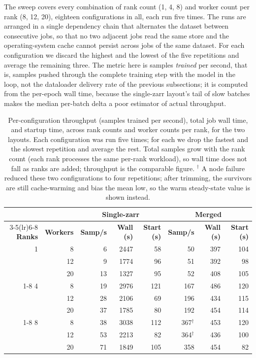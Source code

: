 \documentclass[12pt,a4paper]{article}
\begin{document}
The sweep covers every combination of rank count (1, 4, 8) and worker count per rank
(8, 12, 20), eighteen configurations in all, each run five times. The runs are arranged in a
single dependency chain that alternates the dataset between consecutive jobs, so that no two
adjacent jobs read the same store and the operating-system cache cannot persist across jobs
of the same dataset. For each configuration we discard the highest and the lowest of the
five repetitions and average the remaining three. The metric here is samples \emph{trained}
per second, that is, samples pushed through the complete training step with the model in the
loop, not the dataloader delivery rate of the previous subsections; it is computed from the
per-epoch wall time, because the single-zarr layout's tail of slow batches makes the median
per-batch delta a poor estimator of actual throughput.

\begin{table}[ht]
\centering
\small
\setlength{\tabcolsep}{5pt}
\begin{tabular}{@{}rrrrrrrr@{}}
\toprule
 & & \multicolumn{3}{c}{\textbf{Single-zarr}} & \multicolumn{3}{c}{\textbf{Merged}} \\
\cmidrule(lr){3-5}\cmidrule(lr){6-8}
\textbf{Ranks} & \textbf{Workers} & \textbf{Samp/s} & \textbf{Wall (s)} & \textbf{Start (s)}
 & \textbf{Samp/s} & \textbf{Wall (s)} & \textbf{Start (s)} \\
\midrule
1  &  8 &  6 & 2447 &  58 &  50 & 397 & 104 \\
   & 12 &  9 & 1774 &  96 &  51 & 392 &  98 \\
   & 20 & 13 & 1327 &  95 &  52 & 408 & 105 \\
\cmidrule(lr){1-8}
4  &  8 & 19 & 2976 & 121 & 167 & 486 & 120 \\
   & 12 & 28 & 2106 &  69 & 196 & 434 & 115 \\
   & 20 & 37 & 1785 &  80 & 192 & 454 & 114 \\
\cmidrule(lr){1-8}
8  &  8 & 38 & 3038 & 112 & 367$^{\dagger}$ & 453 & 120 \\
   & 12 & 53 & 2213 &  82 & 364$^{\dagger}$ & 436 & 100 \\
   & 20 & 71 & 1849 & 105 & 358 & 454 &  82 \\
\bottomrule
\end{tabular}
\caption{Per-configuration throughput (samples trained per second), total job wall time, and
startup time, across rank counts and worker counts per rank, for the two layouts. Each
configuration was run five times; for each we drop the fastest and the slowest repetition
and average the rest. Total samples grow with the rank count (each rank processes the same
per-rank workload), so wall time does not fall as ranks are added; throughput is the
comparable figure. $^{\dagger}$ A node failure reduced these two configurations to four
repetitions; after trimming, the survivors are still cache-warming and bias the mean low, so
the warm steady-state value is shown instead.}
\label{tab:scale-out}
\end{table}
\end{document}
